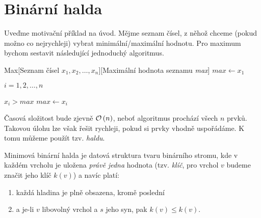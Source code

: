 \section{Binární halda}\label{sec:halda}

Uveďme motivační příklad na úvod. Mějme seznam čísel, z něhož chceme (pokud možno co nejrychleji) vybrat minimální/maximální hodnotu. Pro maximum bychom sestavit následující jednoduchý algoritmus.
\begin{pseudo}{Max}[Seznam čísel $x_1,x_2,\dots,x_n$][Maximální hodnota seznamu \textit{max}]
    $max\gets x_1$\\
    \begin{For}{$i=1,2,\dots,n$}
        \begin{If}{$x_i>max$}
            $max\gets x_i$
        \end{If}
    \end{For}
\end{pseudo}
Časová složitost bude zjevně $\mathcal{O}\left(n\right)$, neboť algoritmus prochází všech $n$ prvků. Takovou úlohu lze však řešit rychleji, pokud si prvky vhodně uspořádáme. K tomu můžeme použít tzv. \emph{haldu}. 
\begin{definition}
    Minimová binární halda je datová struktura tvaru binárního stromu, kde v každém vrcholu je uložena \emph{právě jedna} hodnota (tzv. \emph{klíč}, pro vrchol $v$ budeme značit jeho klíč $k(v)$) a navíc platí:
    \begin{enumerate}[label=(\roman*)]
        \item každá hladina je plně obsazena, kromě poslední
        \item a je-li $v$ libovolný vrchol a $s$ jeho syn, pak $k(v)\leqslant k(v)$.
    \end{enumerate}
\end{definition}


